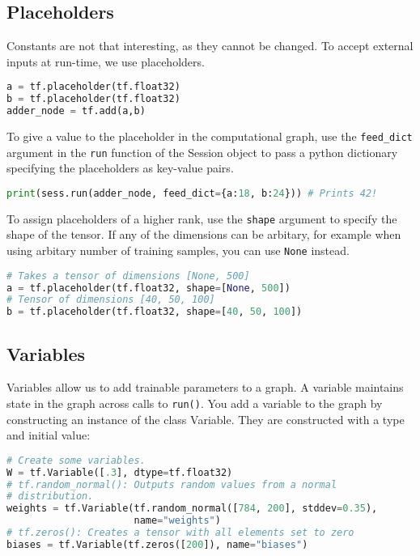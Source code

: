 \documentclass[Proceedings]{ascelike}
\begin{document}
\subsection{Placeholders}
Constants are not that interesting, as they cannot be changed. To accept external inputs at run-time, we use placeholders.

\begin{lstlisting}[language=Python]
a = tf.placeholder(tf.float32)
b = tf.placeholder(tf.float32)
adder_node = tf.add(a,b)
\end{lstlisting}

To give a value to the placeholder in the computational graph, use the \texttt{feed\_dict} argument in the \texttt{run} function of the Session object to pass a python dictionary specifying the placeholders as key-value pairs.

\begin{lstlisting}[language=Python]
print(sess.run(adder_node, feed_dict={a:18, b:24})) # Prints 42!
\end{lstlisting}

To assign placeholders of a higher rank, use the \texttt{shape} argument to specify the shape of the tensor. If any of the dimensions can be arbitary, for example when using arbitary number of training samples, you can use \texttt{None} instead.

\begin{lstlisting}[language=Python]
# Takes a tensor of dimensions [None, 500]
a = tf.placeholder(tf.float32, shape=[None, 500])
# Tensor of dimensions [40, 50, 100]
b = tf.placeholder(tf.float32, shape=[40, 50, 100])
\end{lstlisting}

\subsection{Variables}
Variables allow us to add trainable parameters to a graph. A variable maintains state in the graph across calls to \texttt{run()}. You add a variable to the graph by constructing an instance of the class Variable. They are constructed with a type and initial value:

\begin{lstlisting}[language=Python]
# Create some variables.
W = tf.Variable([.3], dtype=tf.float32)
# tf.random_normal(): Outputs random values from a normal 
# distribution.
weights = tf.Variable(tf.random_normal([784, 200], stddev=0.35),
                      name="weights")
# tf.zeros(): Creates a tensor with all elements set to zero
biases = tf.Variable(tf.zeros([200]), name="biases")
\end{lstlisting}
\end{document}
